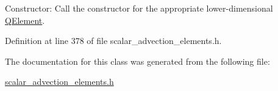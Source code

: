 Constructor\+: Call the constructor for the appropriate lower-\/dimensional \hyperlink{classoomph_1_1QElement}{Q\+Element}. 



Definition at line 378 of file scalar\+\_\+advection\+\_\+elements.\+h.



The documentation for this class was generated from the following file\+:\begin{DoxyCompactItemize}
\item 
\hyperlink{scalar__advection__elements_8h}{scalar\+\_\+advection\+\_\+elements.\+h}\end{DoxyCompactItemize}
